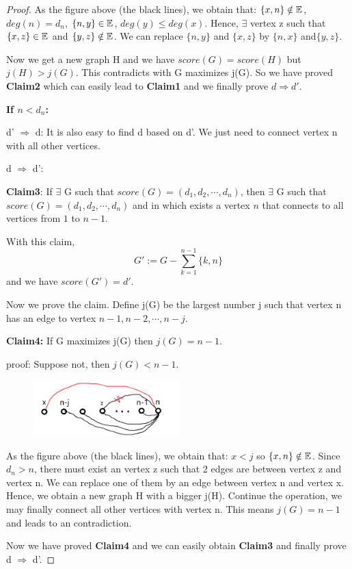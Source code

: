 \documentclass[12pt,a4]{article}
\begin{document}
\begin{proof}
As the figure above (the black lines), we obtain that: $\{ x,n\} \notin \mathbb{E}$, $deg(n)=d_n$, $\{ n,y\} \in \mathbb{E}$, $deg(y) \leq deg(x)$. Hence, $\exists$ vertex z such that $\{ x,z\} \in \mathbb{E}$ and $\{ y,z\} \notin \mathbb{E}$. We can replace $\{ n,y \}$ and $\{ x,z \}$ by $\{ n,x\}$ and$\{ y,z \}$.

Now we get a new graph H and we have $score(G)=score(H)$ but $j(H)>j(G)$. This contradicts with G maximizes j(G). So we have proved \textbf{Claim2} which can easily lead to \textbf{Claim1} and we finally prove $d \Rightarrow d'$.

\textbf{If $n < d_n$:}

d' $\Rightarrow$ d: It is also easy to find d based on d'. We just need to connect vertex n with all other vertices.

d $\Rightarrow$ d':

\textbf{Claim3}:
If $\exists$ G such that $score(G)=(d_1,d_2,\cdots,d_n)$, then $\exists$ G such that $score(G)=(d_1,d_2,\cdots,d_n)$ and in which exists a vertex $n$ that connects to all vertices from $1$ to $n-1$.

With this claim,
\begin{equation*}
G':= G- \sum_{k=1}^{n-1} \{k,n\}
\end{equation*}
and we have $score(G')=d'$.

Now we prove the claim. Define j(G) be the largest number j such that vertex n has an edge to vertex $n-1,n-2,\cdots,n-j$.

\textbf{Claim4:}
If G maximizes j(G) then $j(G)=n-1$.

proof: Suppose not, then $j(G)<n-1$.
\begin{figure}[!htb]
    \centering
    \includegraphics[width=0.5\textwidth]{3.jpg}
\end{figure}

As the figure above (the black lines), we obtain that: $x<j $ so $\{ x,n\} \notin \mathbb{E}$. Since $d_n>n$, there must exist an vertex z such that 2 edges are between vertex z and vertex n. We can replace one of them by an edge between vertex n and vertex x. Hence, we obtain a new graph H with a bigger j(H). Continue the operation, we may finally connect all other vertices with vertex n. This means $j(G)=n-1$ and leads to an contradiction.

Now we have proved \textbf{Claim4} and we can easily obtain \textbf{Claim3} and finally prove d $\Rightarrow$ d'.





\end{proof}
\end{document}
